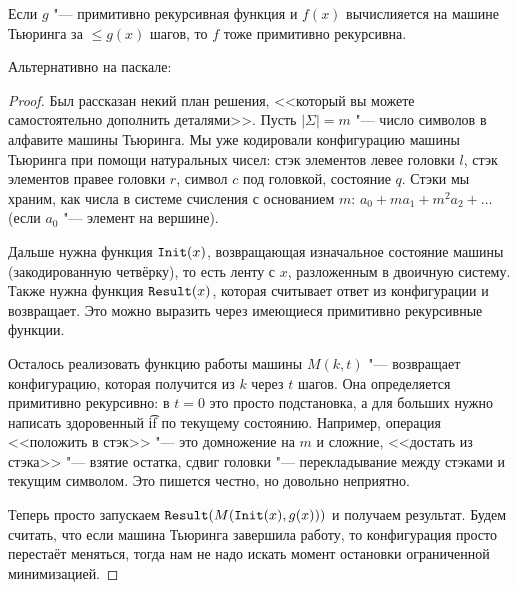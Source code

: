 \begin{theorem}\label{primitiveRecursiveTuring}
	Если $g$ "--- примитивно рекурсивная функция и $f(x)$ вычислияется на машине Тьюринга за $\le g(x)$ шагов, то $f$ тоже примитивно рекурсивна.
\end{theorem}
\begin{Rem}
	Альтернативно на паскале: \TODO
\end{Rem}
\begin{proof}
	Был рассказан некий план решения, <<который вы можете самостоятельно дополнить деталями>>.
	Пусть $|\Sigma|=m$ "--- число символов в алфавите машины Тьюринга.
	Мы уже кодировали конфигурацию машины Тьюринга при помощи натуральных чисел: стэк элементов левее головки $l$,
	стэк элементов правее головки $r$, символ $c$ под головкой, состояние $q$.
	Стэки мы храним, как числа в системе счисления с основанием $m$: $a_0+ma_1+m^2a_2+\dots$ (если $a_0$ "--- элемент на вершине).

	Дальше нужна функция $\texttt{Init}(x)$, возвращающая изначальное состояние машины (закодированную четвёрку),
	то есть ленту с $x$, разложенным в двоичную систему.
	Также нужна функция $\texttt{Result}(x)$, которая считывает ответ из конфигурации и возвращает.
	Это можно выразить через имеющиеся примитивно рекурсивные функции.

	Осталось реализовать функцию работы машины $M(k, t)$ "--- возвращает конфигурацию, которая
	получится из $k$ через $t$ шагов.
	Она определяется примитивно рекурсивно: в $t=0$ это просто подстановка, а для больших нужно написать здоровенный \t{if} по текущему состоянию.
	Например, операция <<положить в стэк>> "--- это домножение на $m$ и сложние, <<достать из стэка>> "--- взятие остатка, сдвиг головки "--- перекладывание между стэками и текущим символом.
	Это пишется честно, но довольно неприятно.

	Теперь просто запускаем $\texttt{Result}(M(\texttt{Init}(x), g(x)))$ и получаем результат.
	Будем считать, что если машина Тьюринга завершила работу, то конфигурация просто перестаёт меняться, тогда нам не надо искать момент остановки ограниченной минимизацией.
\end{proof}

